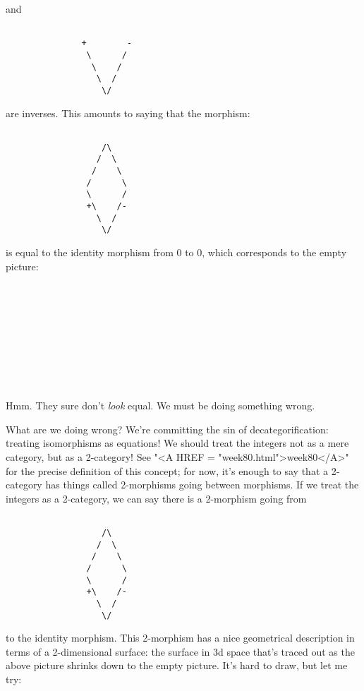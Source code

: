 and

\begin{verbatim}

               +        -
                \      /
                 \    /
                  \  /
                   \/

\end{verbatim}
    
are inverses.  This amounts to saying that the morphism:


\begin{verbatim}

                   /\
                  /  \
                 /    \
                /      \
                \      /
                +\    /-
                  \  /
                   \/

\end{verbatim}
    
is equal to the identity morphism from 0 to 0, which corresponds to the
empty picture:

\begin{verbatim}










\end{verbatim}
    
Hmm.  They sure don't \emph{look} equal.  We must be doing something wrong.

What are we doing wrong?  We're committing the sin of
decategorification: treating isomorphisms as equations!  We should treat
the integers not as a mere category, but as a 2-category!  See "<A HREF = "week80.html">week80</A>"
for the precise definition of this concept; for now, it's enough to say
that a 2-category has things called 2-morphisms going between morphisms.
If we treat the integers as a 2-category, we can say there is a
2-morphism going from


\begin{verbatim}

                   /\
                  /  \
                 /    \
                /      \
                \      /
                +\    /-
                  \  /
                   \/

\end{verbatim}
    
to the identity morphism.  This 2-morphism has a nice geometrical
description in terms of a 2-dimensional surface: the surface in
3d space that's traced out as the above picture shrinks down to the 
empty picture.  It's hard to draw, but let me try:


